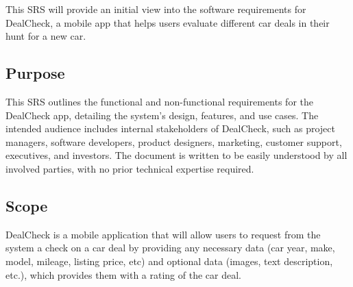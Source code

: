 \documentclass[]{article}
\begin{document}
This SRS will provide an initial view into the software requirements for DealCheck, a mobile app that helps users evaluate different car deals in their hunt for a new car.

\subsection{Purpose}
\label{sub:purpose}
This SRS outlines the functional and non-functional requirements for the DealCheck app, detailing the system's design, features, and use cases. The intended audience includes internal stakeholders of DealCheck, such as project managers, software developers, product designers, marketing, customer support, executives, and investors. The document is written to be easily understood by all involved parties, with no prior technical expertise required.

\subsection{Scope}
\label{sub:scope}

DealCheck is a mobile application that will allow users to request from the system a check on a car deal by providing any necessary data (car year, make, model, mileage, listing price, etc) and optional data (images, text description, etc.), which provides them with a rating of the car deal.
\hfill
\break

\hfill
\break


\end{document}
